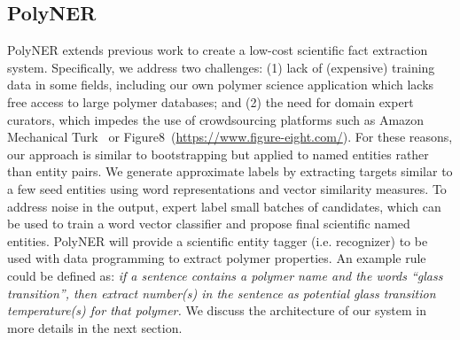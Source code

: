 \subsection{PolyNER}
PolyNER extends previous work to create a low-cost scientific fact extraction system. 
Specifically, we address two challenges: (1) lack of (expensive) training data in some fields, including our own polymer science application which lacks free access to large polymer databases; and (2) the need for domain expert curators, which impedes the use of crowdsourcing platforms such as Amazon Mechanical Turk~\cite{buhrmester2011amazon} or Figure8~(\url{https://www.figure-eight.com/}).
For these reasons, our approach is similar to bootstrapping but applied to named entities rather than entity pairs. 
We generate approximate labels by extracting targets similar to a few seed entities using word representations and vector similarity measures.
To address noise in the output, expert label small batches of candidates, which can be used to train a word vector classifier and propose final scientific named entities.
PolyNER will provide a scientific entity tagger (i.e. recognizer) to be used with data programming to extract polymer properties.
An example rule could be defined as: \textit{if a sentence contains a polymer name and the words ``glass transition'', then extract number(s) in the sentence as potential glass transition temperature(s) for that polymer.}
We discuss the architecture of our system in more details in the next section.